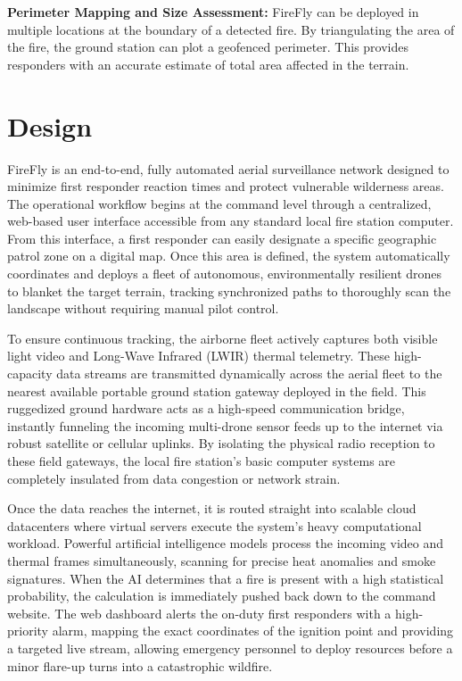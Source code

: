 \documentclass[journal, onecolumn]{IEEEtran}
\begin{document}
\vspace{1em}

\textbf{Perimeter Mapping and Size Assessment:}
FireFly can be deployed in multiple locations at the boundary of a detected fire. By triangulating the area of the fire, the ground station can plot a geofenced perimeter. This provides responders with an accurate estimate of total area affected in the terrain.

\newpage

\section{Design}

FireFly is an end-to-end, fully automated aerial surveillance network designed to minimize first responder reaction times and protect vulnerable wilderness areas. The operational workflow begins at the command level through a centralized, web-based user interface accessible from any standard local fire station computer. From this interface, a first responder can easily designate a specific geographic patrol zone on a digital map. Once this area is defined, the system automatically coordinates and deploys a fleet of autonomous, environmentally resilient drones to blanket the target terrain, tracking synchronized paths to thoroughly scan the landscape without requiring manual pilot control.

To ensure continuous tracking, the airborne fleet actively captures both visible light video and Long-Wave Infrared (LWIR) thermal telemetry. These high-capacity data streams are transmitted dynamically across the aerial fleet to the nearest available portable ground station gateway deployed in the field. This ruggedized ground hardware acts as a high-speed communication bridge, instantly funneling the incoming multi-drone sensor feeds up to the internet via robust satellite or cellular uplinks. By isolating the physical radio reception to these field gateways, the local fire station's basic computer systems are completely insulated from data congestion or network strain.

Once the data reaches the internet, it is routed straight into scalable cloud datacenters where virtual servers execute the system’s heavy computational workload. Powerful artificial intelligence models process the incoming video and thermal frames simultaneously, scanning for precise heat anomalies and smoke signatures. When the AI determines that a fire is present with a high statistical probability, the calculation is immediately pushed back down to the command website. The web dashboard alerts the on-duty first responders with a high-priority alarm, mapping the exact coordinates of the ignition point and providing a targeted live stream, allowing emergency personnel to deploy resources before a minor flare-up turns into a catastrophic wildfire.
\end{document}
